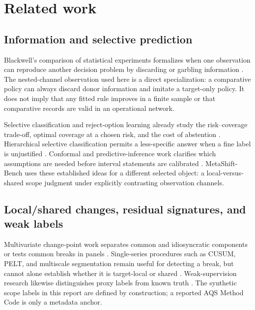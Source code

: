 \section{Related work}
\suppressfloats[t]

\subsection{Information and selective prediction}

Blackwell's comparison of statistical experiments formalizes when one
observation can reproduce another decision problem by discarding or garbling
information \citep{blackwell1951,blackwell1953}. The nested-channel observation
used here is a direct specialization: a comparative policy can always discard
donor information and imitate a target-only policy. It does not imply that any
fitted rule improves in a finite sample or that comparative records are valid in
an operational network.

Selective classification and reject-option learning already study the
risk--coverage trade-off, optimal coverage at a chosen risk, and the cost of
abstention \citep{chow1970,elyaniv2010,bartlett2008,geifman2017,franc2023}.
Hierarchical selective classification permits a less-specific answer when a
fine label is unjustified \citep{goren2024}. Conformal and predictive-inference
work clarifies which assumptions are needed before interval statements are
calibrated \citep{vovk2005,lei2018,romano2019,barber2021,barberlimits2021}.
MetaShift-Bench uses these established ideas for a different selected object:
a local-versus-shared scope judgment under explicitly contrasting observation
channels.

\subsection{Local/shared changes, residual signatures, and weak labels}

Multivariate change-point work separates common and idiosyncratic components or
tests common breaks in panels \citep{bai1998,barigozzi2018}. Single-series
procedures such as CUSUM, PELT, and multiscale segmentation remain useful for
detecting a break, but cannot alone establish whether it is target-local or
shared \citep{killick2012,truong2020,fryzlewicz2014}. Weak-supervision research
likewise distinguishes proxy labels from known truth
\citep{ratner2016,cauchois2024,liu2016,frenay2014}. The synthetic scope labels
in this report are defined by construction; a reported AQS Method Code is only
a metadata anchor.

